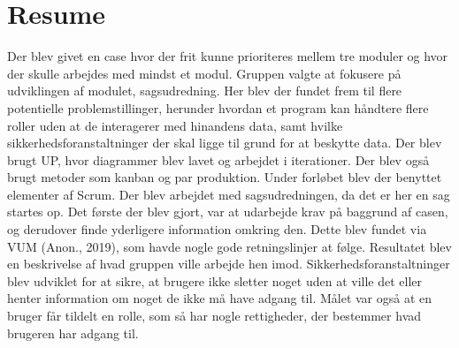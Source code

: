 \chapter{Resume}
Der blev givet en case hvor der frit kunne prioriteres mellem tre moduler og hvor der skulle arbejdes med mindst et modul. 
Gruppen valgte at fokusere på udviklingen af modulet, sagsudredning. 
Her blev der fundet frem til flere potentielle problemstillinger, 
herunder hvordan et program kan håndtere flere roller uden at de interagerer med hinandens data, 
samt hvilke sikkerhedsforanstaltninger der skal ligge til grund for at beskytte data. 
Der blev brugt UP, hvor diagrammer blev lavet og arbejdet i iterationer. 
Der blev også brugt metoder som kanban og par produktion. 
Under forløbet blev der benyttet elementer af Scrum. 
Der blev arbejdet med sagsudredningen, da det er her en sag startes op. 
Det første der blev gjort, var at udarbejde krav på baggrund af casen, 
og derudover finde yderligere information omkring den. 
Dette blev fundet via VUM (Anon., 2019), som havde nogle gode retningslinjer at følge. 
Resultatet blev en beskrivelse af hvad gruppen ville arbejde hen imod. 
Sikkerhedsforanstaltninger blev udviklet for at sikre, at brugere ikke sletter noget uden at ville det eller henter information om noget de ikke må have adgang til. 
Målet var også at en bruger får tildelt en rolle, som så har nogle rettigheder, der bestemmer hvad brugeren har adgang til.